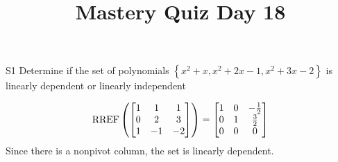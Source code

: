 \documentclass{sbgLAquiz}
\title{Mastery Quiz Day 18 }
\begin{document}
\begin{problem}{S1}
Determine if the set of polynomials  $\left\{x^2+x, x^2+2x-1, x^2+3x-2\right\}$ is  linearly dependent or linearly independent
\end{problem}
\begin{solution}
$$\operatorname{RREF}\left( \begin{bmatrix} 1 &  1 & 1 \\ 0  & 2 & 3 \\ 1  & -1 & -2 \end{bmatrix} \right) = \begin{bmatrix} 1 &  0 & -\frac{1}{2} \\ 0  & 1 & \frac{3}{2} \\ 0& 0 & 0  \end{bmatrix}$$
Since there is a nonpivot column, the set is linearly dependent.
\end{solution}
\end{document}
